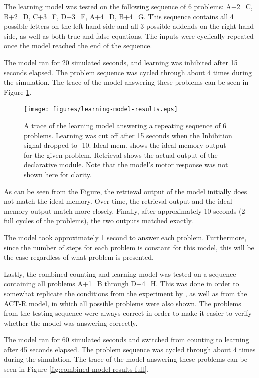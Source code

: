 \documentclass[10pt, a4paper, twocolumn]{article}
\begin{document}
The learning model was tested on the following sequence of 6 problems: A+2=C, B+2=D, C+3=F, D+3=F, A+4=D, B+4=G. This sequence contains all 4 possible letters on the left-hand side and all 3 possible addends on the right-hand side, as well as both true and false equations. The inputs were cyclically repeated once the model reached the end of the sequence.

The model ran for 20 simulated seconds, and learning was inhibited after 15 seconds elapsed. The problem sequence was cycled through about 4 times during the simulation. The trace of the model answering these problems can be seen in Figure \ref{fig:learning-model-results}.

\begin{figure}[h]
	\centering
	\texttt{[image: figures/learning-model-results.eps]}
	\caption{A trace of the learning model answering a repeating sequence of 6 problems. Learning was cut off after 15 seconds when the Inhibition signal dropped to -10. Ideal mem. shows the ideal memory output for the given problem. Retrieval shows the actual output of the declarative module. Note that the model's motor response was not shown here for clarity.}
	\label{fig:learning-model-results}
\end{figure}

As can be seen from the Figure, the retrieval output of the model initially does not match the ideal memory. Over time, the retrieval output and the ideal memory output match more closely. Finally, after approximately 10 seconds (2 full cycles of the problems), the two outputs matched exactly.

The model took approximately 1 second to answer each problem. Furthermore, since the number of steps for each problem is constant for this model, this will be the case regardless of what problem is presented.

Lastly, the combined counting and learning model was tested on a sequence containing all problems A+1=B through D+4=H. This was done in order to somewhat replicate the conditions from the experiment by \cite{Zbrodoff1995}, as well as from the ACT-R model, in which all possible problems were also shown. The problems from the testing sequence were always correct in order to make it easier to verify whether the model was answering correctly.

The model ran for 60 simulated seconds and switched from counting to learning after 45 seconds elapsed. The problem sequence was cycled through about 4 times during the simulation. The trace of the model answering these problems can be seen in Figure \ref{fig:combined-model-results-full}.
	
\end{document}
